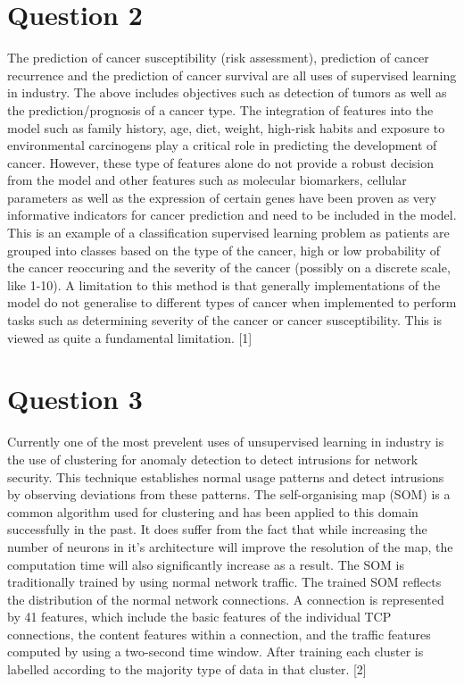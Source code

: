 \documentclass{article}
\begin{document}
\section{Question 2}
The prediction of cancer susceptibility (risk assessment), prediction of cancer recurrence and the prediction of cancer survival are all uses of supervised learning in industry. The above includes objectives such as detection of tumors as well as the prediction/prognosis of a cancer type. The integration of features into the model such as family history, age, diet, weight, high-risk habits and exposure to environmental carcinogens play a critical role in predicting the development of cancer. However, these type of features alone do not provide a robust decision from the model and other features such as molecular biomarkers, cellular parameters as well as the expression of certain genes have been proven as very informative indicators for cancer prediction and need to be included in the model. This is an example of a classification supervised learning problem as patients are grouped into classes based on the type of the cancer, high or low probability of the cancer reoccuring and the severity of the cancer (possibly on a discrete scale, like 1-10). A limitation to this method is that generally implementations of the model do not generalise to different types of cancer when implemented to perform tasks such as determining severity of the cancer or cancer susceptibility. This is viewed as quite a fundamental limitation. [1]

\section{Question 3}
Currently one of the most prevelent uses of unsupervised learning in industry is the use of clustering for anomaly detection to detect intrusions for network security. This technique establishes normal usage patterns and detect intrusions by observing deviations from these patterns. The self-organising map (SOM) is a common algorithm used for clustering and has been applied to this domain successfully in the past. It does suffer from the fact that while increasing the number of neurons in it's architecture will improve the resolution of the map, the computation time will also significantly increase as a result. The SOM is traditionally trained by using normal network traffic. The trained SOM reflects the distribution of the normal network connections. A connection is represented by 41 features, which include the basic features of the individual TCP connections, the content features within a connection, and the traffic features computed by using a two-second time window. After training each cluster is labelled according to the majority type of data in that cluster. [2]
\end{document}

